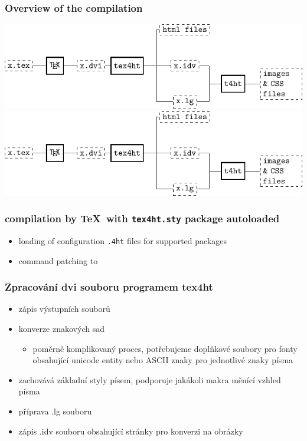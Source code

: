 \begin{frame}
  \frametitle{Overview of the compilation}
  \ifdefined\HCode
      \includegraphics[width=600px]{img/tex4ht_process}
  \else
      \includegraphics[width=\textwidth]{img/tex4ht_process}
  \fi
\end{frame}

\begin{frame}
  \frametitle{compilation by \TeX\ with \texttt{tex4ht.sty} package autoloaded}
  \begin{itemize}
    \item loading of configuration \texttt{.4ht} files for supported packages
    \item command patching to 
  \end{itemize}
\end{frame}

\begin{frame}
  \frametitle{Zpracování dvi souboru programem tex4ht}
  \begin{itemize}
    \item   zápis výstupních souborů
    \item   konverze znakových sad
      \begin{itemize} 
        \item  poměrně komplikovaný proces, potřebujeme
          doplňkové soubory pro fonty obsahující unicode entity nebo ASCII
          znaky pro jednotlivé znaky písma
  \end{itemize}
    \item   zachovává základní styly písem, podporuje jakákoli makra měnící vzhled písma
    \item   příprava .lg souboru
    \item   zápis .idv souboru obsahující stránky pro konverzi na obrázky
  \end{itemize}
\end{frame}

